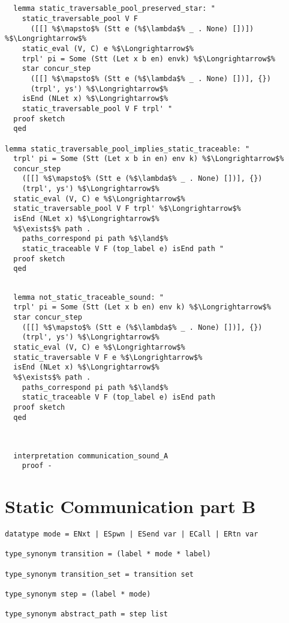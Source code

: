 \documentclass{article}
\begin{document}
\begin{lstlisting}[style=codestyle1, escapechar=\%]


  lemma static_traversable_pool_preserved_star: "
    static_traversable_pool V F
      ([[] %$\mapsto$% (Stt e (%$\lambda$% _ . None) [])]) %$\Longrightarrow$%
    static_eval (V, C) e %$\Longrightarrow$%
    trpl' pi = Some (Stt (Let x b en) envk) %$\Longrightarrow$%
    star concur_step
      ([[] %$\mapsto$% (Stt e (%$\lambda$% _ . None) [])], {})
      (trpl', ys') %$\Longrightarrow$%
    isEnd (NLet x) %$\Longrightarrow$%
    static_traversable_pool V F trpl' "
  proof sketch
  qed

lemma static_traversable_pool_implies_static_traceable: "
  trpl' pi = Some (Stt (Let x b in en) env k) %$\Longrightarrow$%
  concur_step
    ([[] %$\mapsto$% (Stt e (%$\lambda$% _ . None) [])], {})
    (trpl', ys') %$\Longrightarrow$% 
  static_eval (V, C) e %$\Longrightarrow$%
  static_traversable_pool V F trpl' %$\Longrightarrow$%
  isEnd (NLet x) %$\Longrightarrow$%
  %$\exists$% path . 
    paths_correspond pi path %$\land$%
    static_traceable V F (top_label e) isEnd path "
  proof sketch
  qed
  \end{lstlisting}


\begin{lstlisting}[style=codestyle1, escapechar=\%]

  lemma not_static_traceable_sound: "
  trpl' pi = Some (Stt (Let x b en) env k) %$\Longrightarrow$%
  star concur_step
    ([[] %$\mapsto$% (Stt e (%$\lambda$% _ . None) [])], {})
    (trpl', ys') %$\Longrightarrow$% 
  static_eval (V, C) e %$\Longrightarrow$%
  static_traversable V F e %$\Longrightarrow$%
  isEnd (NLet x) %$\Longrightarrow$%
  %$\exists$% path . 
    paths_correspond pi path %$\land$%
    static_traceable V F (top_label e) isEnd path
  proof sketch
  qed
  \end{lstlisting}


\begin{lstlisting}[style=codestyle1, escapechar=\%]


  interpretation communication_sound_A
    proof -

  \end{lstlisting}



\section{Static Communication part B}

\begin{lstlisting}[style=codestyle1, escapechar=\%]
datatype mode = ENxt | ESpwn | ESend var | ECall | ERtn var

type_synonym transition = (label * mode * label)

type_synonym transition_set = transition set

type_synonym step = (label * mode)

type_synonym abstract_path = step list
  \end{lstlisting}
\end{document}
